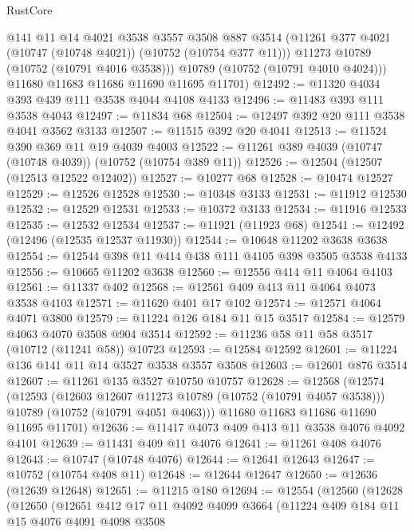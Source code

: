 \begin{lexlean}{RustCore}
\begin{coremodule}
          @141
          @11
          @14
          @4021
          @3538
          @3557
          @3508
          @887
          @3514
          (@11261 @377 @4021 (@10747 (@10748 @4021)) (@10752 (@10754 @377 @11)))
          @11273
          @10789
          (@10752 (@10791 @4016 @3538)))
        @10789
        (@10752 (@10791 @4010 @4024)))
      @11680
      @11683
      @11686
      @11690
      @11695
      @11701)
@12492 := @11320 @4034 @393 @439 @111 @3538 @4044 @4108 @4133
@12496 := @11483 @393 @111 @3538 @4043
@12497 := @11834 @68
@12504 := @12497 @392 @20 @111 @3538 @4041 @3562 @3133
@12507 := @11515 @392 @20 @4041
@12513 := @11524 @390 @369 @11 @19 @4039 @4003
@12522 := @11261 @389 @4039 (@10747 (@10748 @4039)) (@10752 (@10754 @389 @11))
@12526 := @12504 (@12507 (@12513 @12522 @12402))
@12527 := @10277 @68
@12528 := @10474 @12527
@12529 := @12526 @12528
@12530 := @10348 @3133
@12531 := @11912 @12530
@12532 := @12529 @12531
@12533 := @10372 @3133
@12534 := @11916 @12533
@12535 := @12532 @12534
@12537 := @11921 (@11923 @68)
@12541 := @12492 (@12496 (@12535 @12537 @11930))
@12544 := @10648 @11202 @3638 @3638
@12554 := @12544 @398 @11 @414 @438 @111 @4105 @398 @3505 @3538 @4133
@12556 := @10665 @11202 @3638
@12560 := @12556 @414 @11 @4064 @4103
@12561 := @11337 @402
@12568 := @12561 @409 @413 @11 @4064 @4073 @3538 @4103
@12571 := @11620 @401 @17 @102
@12574 := @12571 @4064 @4071 @3800
@12579 := @11224 @126 @184 @11 @15 @3517
@12584 := @12579 @4063 @4070 @3508 @904 @3514
@12592 := @11236 @58 @11 @58 @3517 (@10712 (@11241 @58)) @10723
@12593 := @12584 @12592
@12601 := @11224 @136 @141 @11 @14 @3527 @3538 @3557 @3508
@12603 := @12601 @876 @3514
@12607 := @11261 @135 @3527 @10750 @10757
@12628 := @12568
    (@12574
      (@12593
        (@12603 @12607 @11273 @10789 (@10752 (@10791 @4057 @3538)))
        @10789
        (@10752 (@10791 @4051 @4063)))
      @11680
      @11683
      @11686
      @11690
      @11695
      @11701)
@12636 := @11417 @4073 @409 @413 @11 @3538 @4076 @4092 @4101
@12639 := @11431 @409 @11 @4076
@12641 := @11261 @408 @4076
@12643 := @10747 (@10748 @4076)
@12644 := @12641 @12643
@12647 := @10752 (@10754 @408 @11)
@12648 := @12644 @12647
@12650 := @12636 (@12639 @12648)
@12651 := @11215 @180
@12694 := @12554
    (@12560
      (@12628
        (@12650
          (@12651
            @412
            @17
            @11
            @4092
            @4099
            @3664
            (@11224
              @409
              @184
              @11
              @15
              @4076
              @4091
              @4098
              @3508

\end{coremodule}
\end{lexlean}
